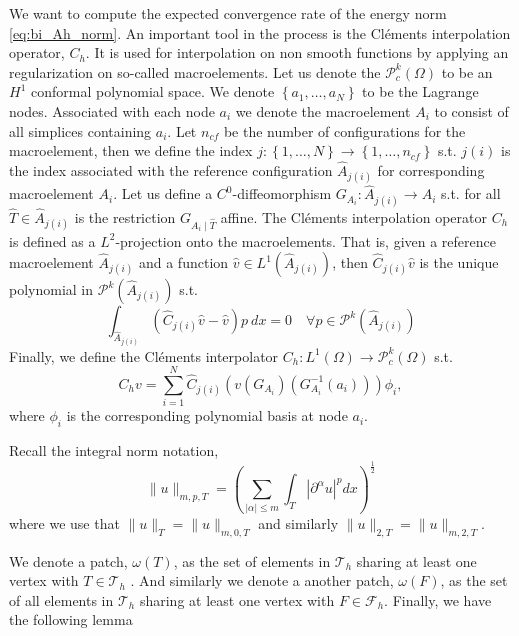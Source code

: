 We want to compute the expected convergence rate of the energy norm \eqref{eq:bi_Ah_norm}. An important tool in the process is the Cléments interpolation operator, $C_{h}$.
It is used for interpolation on non smooth functions by applying an regularization on so-called macroelements. Let us denote the $\mathcal{P}_{c}^{k}( \Omega )  $ to be an $H^{1}$ conformal polynomial space. We denote $\left\{ a_{1}, \ldots, a_{N}
\right\} $ to be the Lagrange nodes. Associated with each node $a_{i}$ we denote the macroelement $A_{i}$ to consist of all simplices containing $a_{i}$. Let $n_{cf}$ be the number of configurations for the macroelement, then we define the index $j:
\left\{ 1,\ldots,N \right\} \to \left\{ 1, \ldots, n_{cf} \right\}  $ s.t. $j( i) $ is the index associated with the reference configuration $\widehat{A}_{j(i) }$ for corresponding macroelement $A_{i}$. Let us define a $C^{0}$-diffeomorphism $G_{A_{i}}:
\widehat{A}_{j( i) } \to A_{i}$ s.t. for all $\widehat{T} \in \widehat{A}_{j( i) } $ is the restriction $G_{A_{i}  \mid \widehat{T}}$ affine. The Cléments interpolation operator $C_{h}$ is defined as a $L^2$-projection onto the macroelements. That is, given
a reference macroelement $\widehat{A}_{j( i) }$ and a function $\hat{v} \in L^{1}( \widehat{A}_{j( i) })  $, then $\widehat{C}_{j( i) } \hat{v}$  is the unique polynomial in $\mathcal{P}^{k} ( \widehat{A}_{j( i) })  $ s.t. \[
\int_{  \widehat{A}_{j( i) }}^{} ( \widehat{C}_{j( i) } \hat{v} - \hat{v}) p \ dx  = 0 \quad  \forall p \in \mathcal{P}^{k} ( \widehat{A}_{j( i) })
\]
Finally, we define the Cléments interpolator $C_{h} : L^{1}( \Omega )  \to \mathcal{P} ^{k}_{c}(\Omega  ) $ s.t.
\[
C_{h} v = \sum_{i=1}^{N} \widehat{C}_{j( i) } ( v (G_{A_{i}}) (G^{-1}_{A_{i}}(a_{i})) )\phi _{i},
\]
where $\phi _{i}$ is the corresponding polynomial basis at node $a_{i}$.

Recall the integral norm notation,
\[
\| u \|_{ m,p,T }^{  } = \left( \sum_{ \left\lvert \alpha  \right\rvert \le m}^{} \int_{T}^{}  \left\lvert  \partial ^{\alpha } u \right\rvert^{p} dx   \right)^{\frac{1}{2}}
\]
where we use that $\| u \|_{ T  }^{  } = \| u \|_{ m,0,T  }^{  } $ and similarly $\| u \|_{ 2,T  }^{  } = \| u \|_{ m,2,T  }^{  }  $.

We denote a patch, $\omega \left( T \right) $, as the set of elements in $\mathcal{T} _{h}$  sharing at least one vertex with $T \in \mathcal{T} _{h}$ . And similarly we denote a another patch, $\omega \left( F \right) $, as the set of all elements in $\mathcal{T}_{h} $
sharing at least one vertex with $F \in  \mathcal{F} _{h}$. Finally, we have the following lemma

